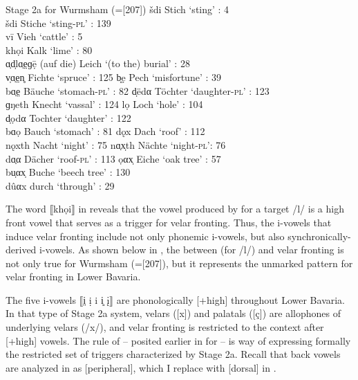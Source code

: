 \ea%
\label{ex:13:4}Stage 2a for Wurmsham (=[207])
\ea\label{ex:13:4a} šdi \tab Stich \tab ‘sting’ : 4\\
    šdi \tab Stiche \tab ‘sting-\textsc{pl}’ : 139\\
    vī \tab Vieh \tab ‘cattle’ : 5\\
    khọi \tab Kalk \tab ‘lime’ : 80\\
\ex\label{ex:13:4b} ɑ̣d̩lɑ̣e̤ɡẹ̄ \tab (auf die) Leich \tab ‘(to the) burial’ : 28\\
    v̩ɑ̣e̤n̥ \tab Fichte \tab ‘spruce’ : 125
\ex\label{ex:13:4c} b͈ẹ \tab Pech \tab ‘misfortune’ : 39\\
    bɑ̣e̤ \tab Bäuche \tab ‘stomach-\textsc{pl}’ : 82
\ex\label{ex:13:4d} d̩ëdα \tab Töchter \tab ‘daughter-\textsc{pl}’ : 123\\
    ɡŋeth \tab Knecht \tab ‘vassal’ : 124
\ex\label{ex:13:4e} lọ \tab Loch \tab ‘hole’ : 104\\
    d̩ọdα \tab Tochter \tab ‘daughter’ : 122\\
    bɑọ \tab Bauch \tab ‘stomach’ : 81
\ex\label{ex:13:4f} dǫx \tab Dach \tab ‘roof’ : 112\\
    nǫxth \tab Nacht \tab ‘night’ : 75
\ex\label{ex:13:4g} nɑ̣x̩th \tab Nächte \tab ‘night-\textsc{pl}': 76\\
    dɑ̣α \tab Dächer \tab ‘roof-\textsc{pl}’ : 113
\ex\label{ex:13:4h} ọαx̩ \tab Eiche \tab ‘oak tree’ : 57\\
    bu̩αx̩ \tab Buche \tab ‘beech tree’ : 130\\
    dûαx \tab durch \tab ‘through’ : 29
    \z
\z 

The word ⟦khọi⟧ in  reveals that the vowel produced by  for a target /l/ is a high front vowel that serves as a trigger for velar fronting. Thus, the i-vowels that induce velar fronting include not only phonemic i-vowels, but also synchronically-derived i-vowels. As shown below in , the  between  (for /l/) and velar fronting is not only true for Wurmsham (=[207]), but it represents the unmarked pattern for velar fronting in Lower Bavaria.

The five i-vowels ⟦i̤ ị i i͈ \k{i}⟧ are phonologically [+high] throughout Lower Bavaria. In that type of Stage 2a system, velars ([x]) and palatals ([ç]) are allophones of underlying velars (/x/), and velar fronting is restricted to the context after [+high] vowels. The rule of  -- posited earlier in  for  -- is way of expressing formally the restricted set of triggers characterized by Stage 2a. Recall that back vowels are analyzed in  as [peripheral], which I replace with [dorsal] in .

